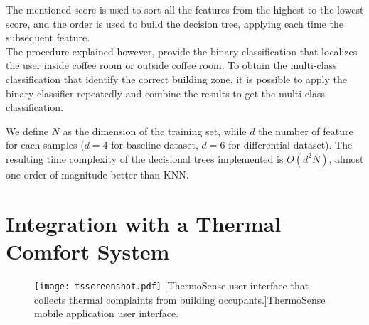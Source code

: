 The mentioned score is used to sort all the features from the highest to the lowest score, and the order is used to build the decision tree, applying each time the subsequent feature.\\
The procedure explained however, provide the binary classification that localizes the user inside coffee room or outside coffee room. To obtain the multi-class classification that identify the correct building zone, it is possible to apply the binary classifier repeatedly and combine the results to get the multi-class classification.

We define $N$ as the dimension of the training set, while $d$ the number of feature for each samples ($d=4$ for baseline dataset, $d=6$ for differential dataset). The resulting time complexity of the decisional trees implemented is $O(d^2N)$, almost one order of magnitude better than KNN.





\section{Integration with a Thermal Comfort System}
\label{sec:thermosense}

\begin{figure}[h!tb]
\center
\texttt{[image: tsscreenshot.pdf]}
[ThermoSense user interface that collects thermal complaints from building occupants.]{ThermoSense mobile application user interface.}
\label{fig:thermoUI}
\end{figure}

